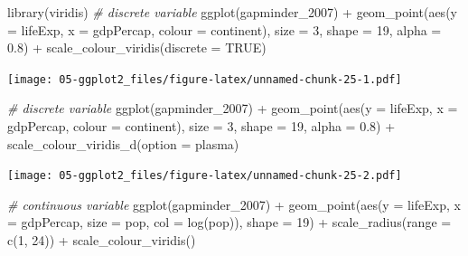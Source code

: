 \documentclass[
]{book}
\newenvironment{Shaded}{\begin{snugshade}}{\end{snugshade}}
\newcommand{\AttributeTok}[1]{\textcolor[rgb]{0.77,0.63,0.00}{#1}}
\newcommand{\CommentTok}[1]{\textcolor[rgb]{0.56,0.35,0.01}{\textit{#1}}}
\newcommand{\ConstantTok}[1]{\textcolor[rgb]{0.00,0.00,0.00}{#1}}
\newcommand{\DecValTok}[1]{\textcolor[rgb]{0.00,0.00,0.81}{#1}}
\newcommand{\FloatTok}[1]{\textcolor[rgb]{0.00,0.00,0.81}{#1}}
\newcommand{\FunctionTok}[1]{\textcolor[rgb]{0.00,0.00,0.00}{#1}}
\newcommand{\NormalTok}[1]{#1}
\newcommand{\SpecialCharTok}[1]{\textcolor[rgb]{0.00,0.00,0.00}{#1}}
\newcommand{\StringTok}[1]{\textcolor[rgb]{0.31,0.60,0.02}{#1}}
\begin{document}
\begin{Shaded}
\begin{Highlighting}[]
\FunctionTok{library}\NormalTok{(viridis)}
\CommentTok{\# discrete variable}
\FunctionTok{ggplot}\NormalTok{(gapminder\_2007) }\SpecialCharTok{+} 
  \FunctionTok{geom\_point}\NormalTok{(}\FunctionTok{aes}\NormalTok{(}\AttributeTok{y =}\NormalTok{ lifeExp, }\AttributeTok{x =}\NormalTok{ gdpPercap, }\AttributeTok{colour =}\NormalTok{ continent), }\AttributeTok{size =} \DecValTok{3}\NormalTok{, }
           \AttributeTok{shape =} \DecValTok{19}\NormalTok{, }\AttributeTok{alpha =} \FloatTok{0.8}\NormalTok{) }\SpecialCharTok{+}
  \FunctionTok{scale\_colour\_viridis}\NormalTok{(}\AttributeTok{discrete =} \ConstantTok{TRUE}\NormalTok{)}
\end{Highlighting}
\end{Shaded}

\texttt{[image: 05-ggplot2\_files/figure-latex/unnamed-chunk-25-1.pdf]}

\begin{Shaded}
\begin{Highlighting}[]
\CommentTok{\# discrete variable}
\FunctionTok{ggplot}\NormalTok{(gapminder\_2007) }\SpecialCharTok{+} 
  \FunctionTok{geom\_point}\NormalTok{(}\FunctionTok{aes}\NormalTok{(}\AttributeTok{y =}\NormalTok{ lifeExp, }\AttributeTok{x =}\NormalTok{ gdpPercap, }\AttributeTok{colour =}\NormalTok{ continent), }\AttributeTok{size =} \DecValTok{3}\NormalTok{, }
             \AttributeTok{shape =} \DecValTok{19}\NormalTok{, }\AttributeTok{alpha =} \FloatTok{0.8}\NormalTok{) }\SpecialCharTok{+}
  \FunctionTok{scale\_colour\_viridis\_d}\NormalTok{(}\AttributeTok{option =} \StringTok{\textquotesingle{}plasma\textquotesingle{}}\NormalTok{)}
\end{Highlighting}
\end{Shaded}

\texttt{[image: 05-ggplot2\_files/figure-latex/unnamed-chunk-25-2.pdf]}

\begin{Shaded}
\begin{Highlighting}[]

\CommentTok{\# continuous variable}
\FunctionTok{ggplot}\NormalTok{(gapminder\_2007) }\SpecialCharTok{+} 
  \FunctionTok{geom\_point}\NormalTok{(}\FunctionTok{aes}\NormalTok{(}\AttributeTok{y =}\NormalTok{ lifeExp, }\AttributeTok{x =}\NormalTok{ gdpPercap, }\AttributeTok{size =}\NormalTok{ pop, }\AttributeTok{col =} \FunctionTok{log}\NormalTok{(pop)), }\AttributeTok{shape =} \DecValTok{19}\NormalTok{) }\SpecialCharTok{+}
  \FunctionTok{scale\_radius}\NormalTok{(}\AttributeTok{range =} \FunctionTok{c}\NormalTok{(}\DecValTok{1}\NormalTok{, }\DecValTok{24}\NormalTok{)) }\SpecialCharTok{+}
  \FunctionTok{scale\_colour\_viridis}\NormalTok{()}
\end{Highlighting}
\end{Shaded}
\end{document}
